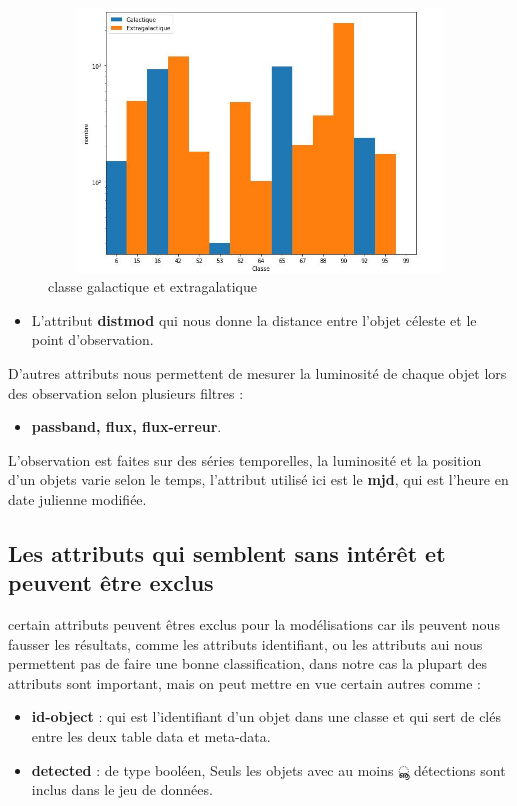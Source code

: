 \begin{figure}[!h]
    \centering
    \includegraphics[width=12cm,height=7cm]{report/figures/galactic.jpg}
    \caption{classe galactique et extragalatique}
    \label{fig:my_label}
\end{figure}
\newline
\begin{itemize}
    \item L’attribut \textbf{distmod} qui nous donne la distance entre l’objet céleste et le point d’observation.
\end{itemize}



\newline
D’autres attributs nous permettent de mesurer la luminosité de chaque objet lors des observation selon plusieurs filtres :
\begin{itemize}
    \item \textbf{passband, flux, flux-erreur}.
\end{itemize}
\newline
L’observation est faites sur des séries temporelles, la luminosité et la position d’un objets varie selon le temps, l’attribut utilisé ici est le \textbf{mjd}, qui est l’heure en date julienne modifiée.

\subsection{Les attributs qui semblent sans intérêt et peuvent être exclus}
certain attributs peuvent êtres exclus pour la modélisations car ils peuvent nous fausser les résultats, comme les attributs identifiant, ou les attributs aui nous permettent pas de faire une bonne classification, dans notre cas la plupart des attributs sont important, mais on peut mettre en vue certain autres comme :
\begin{itemize}
    \item \textbf{id-object }: qui est l’identifiant d’un objet dans une classe et qui sert de clés entre les deux table data et meta-data.
    \item \textbf{detected }: de type booléen, Seuls les objets avec au moins ൣ détections sont inclus
dans le jeu de données.
\end{itemize}
